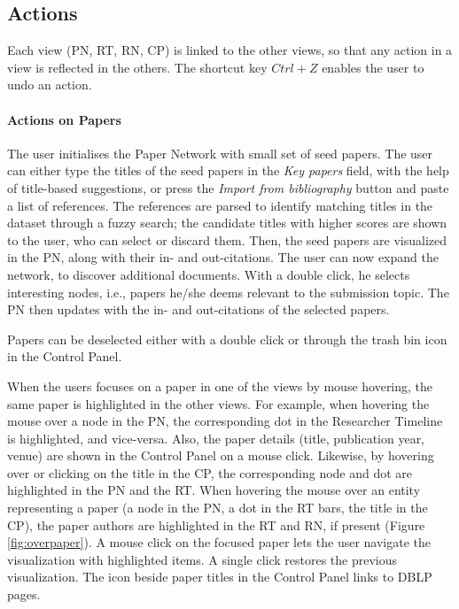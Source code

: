 \subsection{Actions}
\label{subsec:actions}

Each view (PN, RT, RN, CP) is linked to the other views, so that any action in a view is reflected in the others. The shortcut key $Ctrl+Z$ enables the user to undo an action.

\paragraph*{Actions on Papers} 
The user initialises the Paper Network with small set of seed papers. The user can either type the titles of the seed papers in the \emph{Key papers} field, with the help of title-based suggestions, or press the \emph{Import from bibliography} button and paste a list of references. The references are parsed to identify matching titles in the dataset through a fuzzy search; the candidate titles with higher scores are shown to the user, who can select or discard them. Then, the seed papers are visualized in the PN, along with their in- and out-citations. The user can now expand the network, to discover additional documents. With a double click, he selects interesting nodes, i.e., papers he/she deems relevant to the submission topic. The PN then updates with the in- and out-citations of the selected papers. 

Papers can be deselected either with a double click or through the trash bin icon in the Control Panel. 

When the users focuses on a paper in one of the views by mouse hovering, the same paper is highlighted in the other views. For example, when hovering the mouse over a node in the PN, the corresponding dot in the Researcher Timeline is highlighted, and vice-versa. Also, the paper details (title, publication year, venue) are shown in the Control Panel on a mouse click. Likewise, by hovering over or clicking on the title in the CP, the corresponding node and dot are highlighted in the PN and the RT. When hovering the mouse over an entity representing a paper (a node in the PN, a dot in the RT bars, the title in the CP), the paper authors are highlighted in the RT and RN, if present (Figure \ref{fig:overpaper}). A mouse click on the focused paper lets the user navigate the visualization with highlighted items. A single click restores the previous visualization.
The icon beside paper titles in the Control Panel links to DBLP pages. 


